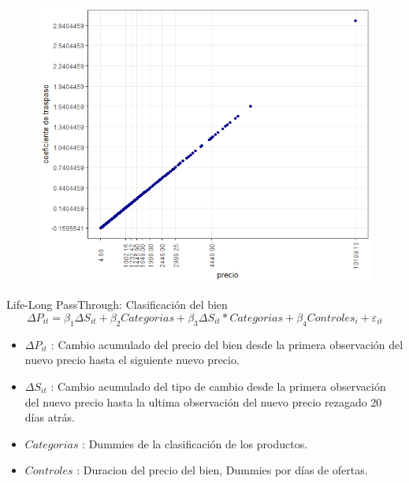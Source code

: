 \documentclass[xcolor=dvipsnames]{beamer}
\begin{document}
\begin{frame}
\begin{figure}
\includegraphics[scale=0.50]{E2.png}
\end{figure}
\end{frame}

\begin{frame}
Life-Long PassThrough: Clasificaci\'on del bien
\begin{equation}
\Delta P_{it} = \beta_{1} \Delta S_{it}  + \beta_{2}Categorias + \beta_{3}\Delta S_{it}*Categorias + \beta_{4}Controles_{i} + \varepsilon_{it}
\end{equation}
\begin{itemize}
	\item $\Delta P_{it}$ : Cambio acumulado del precio del bien desde la primera observaci\'on del nuevo precio hasta el siguiente nuevo precio.
	\item $\Delta S_{it}$ : Cambio acumulado del tipo de cambio desde la primera observaci\'on del nuevo precio hasta la ultima observaci\'on del nuevo precio rezagado 20 d\'ias atr\'as.
	\item $Categorias$ : Dummies de la clasificaci\'on de los productos.
	\item $Controles$ : Duracion del precio del bien, Dummies por d\'ias de ofertas.
\end{itemize}
\end{frame}
\end{document}
